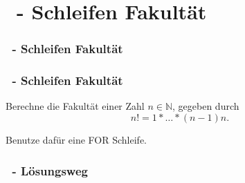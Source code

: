 \def\stitle{\theexercise\ - Schleifen Fakultät}
\section{\stitle}
\begin{frame}
  \frametitle{\stitle}%
\tableofcontents[current]
\end{frame}

\begin{frame}[t]%
    \frametitle{\stitle}

Berechne die Fakultät einer Zahl $n\in\mathbb{N}$, gegeben durch $$n!=1*\ldots*(n-1)n.$$

Benutze dafür eine FOR Schleife.
\pause

\end{frame}


\begin{frame}[fragile]%
 \frametitle{\theexercise\ - L\"osungsweg}%

\end{frame}
